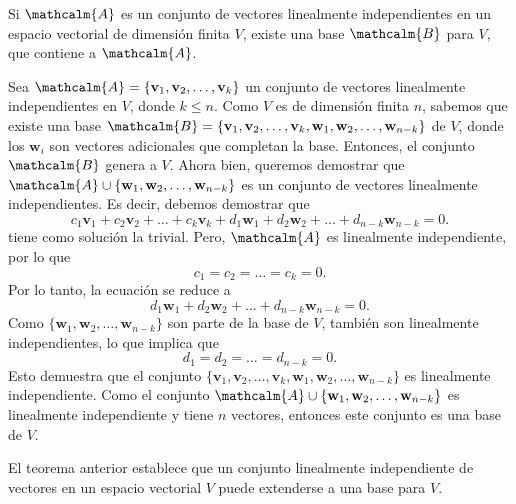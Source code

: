 \begin{theorem}{}{}
    Si $\mathcalm{A}$ es un conjunto de vectores linealmente independientes en un espacio vectorial de dimensión finita $V$, existe una base $\mathcalm{B}$ para $V$, que contiene a $\mathcalm{A}$.

    \tcblower
    \demostracion Sea $\mathcalm{A} = \{ \mathbf{v}_1, \mathbf{v}_2, \dots, \mathbf{v}_k \}$ un conjunto de vectores linealmente independientes en $V$, donde $k \leq n$. Como $V$ es de dimensión finita $n$, sabemos que existe una base $\mathcalm{B} = \{ \mathbf{v}_1, \mathbf{v}_2, \dots, \mathbf{v}_k, \mathbf{w}_1, \mathbf{w}_2, \dots, \mathbf{w}_{n-k} \}$ de $V$, donde los $\mathbf{w}_i$ son vectores adicionales que completan la base. Entonces, el conjunto $\mathcalm{B}$ genera a $V$. Ahora bien, queremos demostrar que $\mathcalm{A} \cup \{\mathbf{w}_1, \mathbf{w}_2, \dots, \mathbf{w}_{n-k}\}$ es un conjunto de vectores linealmente independientes. Es decir, debemos demostrar que
    $$c_1 \mathbf{v}_1 + c_2 \mathbf{v}_2 + \dots + c_k \mathbf{v}_k + d_1 \mathbf{w}_1 + d_2 \mathbf{w}_2 + \dots + d_{n-k} \mathbf{w}_{n-k} = 0.$$
    tiene como solución la trivial. Pero, $\mathcalm{A}$ es linealmente independiente, por lo que
    $$c_1 = c_2 = \dots = c_k = 0.$$
    \newpage
    Por lo tanto, la ecuación se reduce a
    $$d_1 \mathbf{w}_1 + d_2 \mathbf{w}_2 + \dots + d_{n-k} \mathbf{w}_{n-k} = 0.$$
    Como $\{ \mathbf{w}_1, \mathbf{w}_2, \dots, \mathbf{w}_{n-k} \}$ son parte de la base de $V$, también son linealmente independientes, lo que implica que
    $$d_1 = d_2 = \dots = d_{n-k} = 0.$$
	Esto demuestra que el conjunto $\{ \mathbf{v}_1, \mathbf{v}_2, \dots, \mathbf{v}_k, \mathbf{w}_1, \mathbf{w}_2, \dots, \mathbf{w}_{n-k} \}$ es linealmente independiente. Como el conjunto $\mathcalm{A} \cup \{ \mathbf{w}_1, \mathbf{w}_2, \dots, \mathbf{w}_{n-k} \}$ es linealmente independiente y tiene $n$ vectores, entonces este conjunto es una base de $V$.
\end{theorem}

El teorema anterior establece que un conjunto linealmente independiente de vectores en un espacio vectorial $V$ puede extenderse a una base para $V$.

